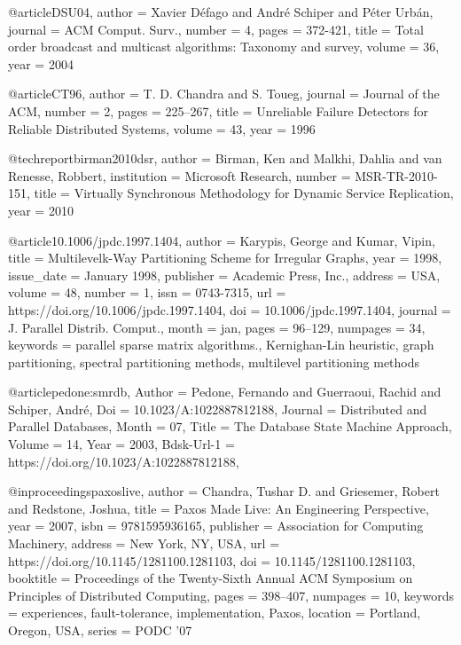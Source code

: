 @article{DSU04,
  author  = {Xavier D{\'e}fago and Andr{\'e} Schiper and P{\'e}ter Urb{\'a}n},
  journal = {ACM Comput. Surv.},
  number  = {4},
  pages   = {372-421},
  title   = {Total order broadcast and multicast algorithms: Taxonomy and survey},
  volume  = {36},
  year    = {2004}
}

@article{CT96,
  author  = {T. D. Chandra and S. Toueg},
  journal = {Journal of the ACM},
  number  = {2},
  pages   = {225--267},
  title   = {Unreliable Failure Detectors for Reliable Distributed Systems},
  volume  = {43},
  year    = {1996}
}

@techreport{birman2010dsr,
  author      = {Birman, Ken and Malkhi, Dahlia and van Renesse, Robbert},
  institution = {Microsoft Research},
  number      = {MSR-TR-2010-151},
  title       = {Virtually Synchronous Methodology for Dynamic Service Replication},
  year        = {2010}
}

@article{10.1006/jpdc.1997.1404,
author = {Karypis, George and Kumar, Vipin},
title = {Multilevelk-Way Partitioning Scheme for Irregular Graphs},
year = {1998},
issue_date = {January 1998},
publisher = {Academic Press, Inc.},
address = {USA},
volume = {48},
number = {1},
issn = {0743-7315},
url = {https://doi.org/10.1006/jpdc.1997.1404},
doi = {10.1006/jpdc.1997.1404},
journal = {J. Parallel Distrib. Comput.},
month = jan,
pages = {96–129},
numpages = {34},
keywords = {parallel sparse matrix algorithms., Kernighan-Lin heuristic, graph partitioning, spectral partitioning methods, multilevel partitioning methods}
}


@article{pedone:smrdb,
	Author = {Pedone, Fernando and Guerraoui, Rachid and Schiper, Andr{\'e}},
	Doi = {10.1023/A:1022887812188},
	Journal = {Distributed and Parallel Databases},
	Month = {07},
	Title = {The Database State Machine Approach},
	Volume = {14},
	Year = {2003},
	Bdsk-Url-1 = {https://doi.org/10.1023/A:1022887812188},
  }


@inproceedings{paxoslive,
author = {Chandra, Tushar D. and Griesemer, Robert and Redstone, Joshua},
title = {Paxos Made Live: An Engineering Perspective},
year = {2007},
isbn = {9781595936165},
publisher = {Association for Computing Machinery},
address = {New York, NY, USA},
url = {https://doi.org/10.1145/1281100.1281103},
doi = {10.1145/1281100.1281103},
booktitle = {Proceedings of the Twenty-Sixth Annual ACM Symposium on Principles of Distributed Computing},
pages = {398–407},
numpages = {10},
keywords = {experiences, fault-tolerance, implementation, Paxos},
location = {Portland, Oregon, USA},
series = {PODC ’07}
}


